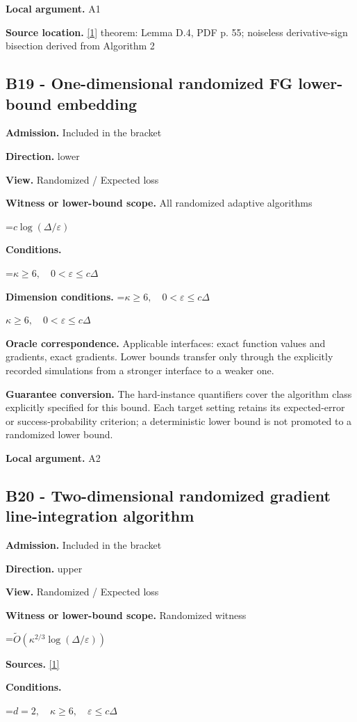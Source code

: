 \documentclass[10pt,a4paper]{article}
\newcommand{\AtlasMath}[1]{\par\begingroup\centering\setbox0=\hbox{$\displaystyle #1$}\ifdim\wd0>1.4\linewidth\typeout{ATLAS WIDE FORMULA: \the\wd0}\fi\ifdim\wd0>\linewidth\resizebox{\linewidth}{!}{\box0}\else\box0\fi\par\endgroup}
\newcommand{\AtlasInlineMath}[1]{\begingroup\setbox0=\hbox{$#1$}\ifdim\wd0>.4\linewidth\endgroup\AtlasMath{#1}\else\endgroup$#1$\fi}
\begin{document}
\textbf{Local argument.} A1

\textbf{Source location.} \href{https://arxiv.org/pdf/2609.03990}{[1]} theorem: Lemma D.4, PDF p. 55; noiseless derivative-sign bisection derived from Algorithm 2

\subsection{B19 - One-dimensional randomized FG lower-bound embedding}
\textbf{Admission.} Included in the bracket

\textbf{Direction.} lower

\textbf{View.} Randomized / Expected loss

\textbf{Witness or lower-bound scope.} All randomized adaptive algorithms

\AtlasMath{c\log(\Delta/\varepsilon)}
\textbf{Conditions.} 
\AtlasMath{\kappa\ge6,\quad0<\varepsilon\le c\Delta}


\textbf{Dimension conditions.} \AtlasInlineMath{\kappa\ge6,\quad0<\varepsilon\le c\Delta}

\textbf{Oracle correspondence.} Applicable interfaces: exact function values and gradients, exact gradients. Lower bounds transfer only through the explicitly recorded simulations from a stronger interface to a weaker one.

\textbf{Guarantee conversion.} The hard-instance quantifiers cover the algorithm class explicitly specified for this bound. Each target setting retains its expected-error or success-probability criterion; a deterministic lower bound is not promoted to a randomized lower bound.

\textbf{Local argument.} A2

\subsection{B20 - Two-dimensional randomized gradient line-integration algorithm}
\textbf{Admission.} Included in the bracket

\textbf{Direction.} upper

\textbf{View.} Randomized / Expected loss

\textbf{Witness or lower-bound scope.} Randomized witness

\AtlasMath{\widetilde{O}(\kappa^{2/3}\log(\Delta/\varepsilon))}
\textbf{Sources.} \href{https://arxiv.org/pdf/2609.03990}{[1]}

\textbf{Conditions.} 
\AtlasMath{d=2,\quad\kappa\ge6,\quad\varepsilon\le c\Delta}
\end{document}
